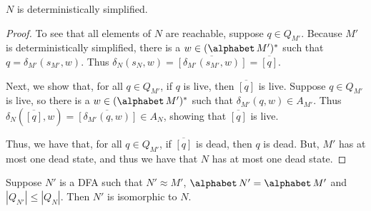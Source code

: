\begin{lemma}
\label{MinimizationLemma7}
$N$ is deterministically simplified.
\end{lemma}

\begin{proof}
To see that all elements of $N$ are reachable, suppose $q\in Q_{M'}$.
Because $M'$ is deterministically simplified, there is a
$w\in(\alphabet\,M')^*$ such that $q=\delta_{M'}(s_{M'},w)$.  Thus
$\delta_N(s_N,w) = \overline{[\delta_{M'}(s_{M'},w)]} = \overline{[q]}$.

Next, we show that, for all $q\in Q_{M'}$, if $q$ is live, then
$\overline{[q]}$ is live.  Suppose $q\in Q_{M'}$ is live,
so there is a $w\in(\alphabet\,M')^*$ such that $\delta_{M'}(q,w)\in A_{M'}$.
Thus $\delta_N(\overline{[q]},w)=\overline{[\delta_{M'}(q,w)]}\in A_N$,
showing that $\overline{[q]}$ is live.

Thus, we have that, for all $q\in Q_{M'}$, if $\overline{[q]}$ is
dead, then $q$ is dead.  But, $M'$ has at most one dead state, and
thus we have that $N$ has at most one dead state.
\end{proof}

\begin{lemma}
\label{MinimizationLemma8}
Suppose $N'$ is a DFA such that $N'\approx M'$,
$\alphabet\,N'=\alphabet\,M'$ and $|Q_{N'}|\leq|Q_N|$.  Then $N'$ is
isomorphic to $N$.
\end{lemma}

